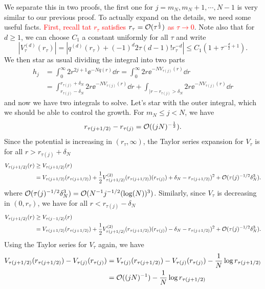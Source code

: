 We separate this in two proofs, the first one for $j = m_N, m_N + 1, \cdots, N-1$  is very similar to our previous proof. To actually expand on the details, we need some useful facts. \textcolor{red}{First, recall tat $r_{\tau}$ satisfies $r_\tau = \mathcal{O}(\tau^{\frac{1}{2}})$ as $\tau \rightarrow 0$}. Note also that for $d \geq 1$, we can choose $C_1$ a constant uniformly for all $\tau$ and write
\begin{equation}
	|V^{(d)}_\tau(r_\tau)| = |q^{(d)}(r_\tau) + (-1)^{d} 2 \tau (d-1)! r_\tau^{-d} | \leq C_1 (1 + \tau^{-\frac{d}{2} + 1}).
\end{equation} 
We then star as usual dividing the integral into two parts
\begin{align}
	h_j & = \int_{0}^{\infty} 2 r^{2j + 1} \ee^{-N q(r)} \dd r = \int_{0}^{\infty} 2 r \ee^{-N V_{\tau(j)} (r)} \dd r \\
	&= \int_{r_{\tau(j)} - \delta_N}^{r_{\tau(j)} + \delta_N} 2 r \ee^{-N V_{\tau(j)}(r)} \dd r+ \int_{|r - r_{\tau(j)} > \delta_N} 2 r \ee^{-NV_{\tau(j)}(r)} \dd r
\end{align}
and now we have two integrals to solve. Let's star with the outer integral, which we should be able to control the growth. For $m_N \leq j < N$, we have
\begin{equation}
	r_{\tau(j + 1/2)} - r_{\tau(j)} = \mathcal{O}((jN)^{-\frac{1}{2}}).
\end{equation}
Since the potential is increasing in $(r_\tau, \infty)$, the Taylor series expansion for $V_\tau$ is for all $r > r_{\tau(j)} + \delta_N$
\begin{align}
	V_{\tau(j + 1/2)}(r) & \geq V_{\tau(j + 1/2)}(r) \\
	& = V_{\tau(j + 1/2)}(r_{\tau(j + 1/2)}) + \frac{1}{2} V^{(2)}_{\tau(j + 1/2)}(r_{\tau(j + 1/2)}) (r_{\tau(j)}) + \delta_N - r_{\tau(j + 1/2)})^2 + \mathcal{O}(\tau(j)^{-1/2} \delta^3_N).
\end{align}
where $\mathcal{O}(\tau(j)^{-1/2} \delta^3_N) = \mathcal{O}(N^{-1} j^{-1/2}(\log(N))^3)$. Similarly, since $V_{\tau}$ is decreasing in $(0, r_\tau)$, we have for all $r < r_{\tau(j)} - \delta_N$
\begin{align}
	V_{\tau(j + 1/2)}(r) & \geq V_{\tau(j - 1/2)}(r) \\
	& = V_{\tau(j + 1/2)}(r_{\tau(j + 1/2)}) + \frac{1}{2} V^{(2)}_{\tau(j + 1/2)}(r_{\tau(j + 1/2)}) (r_{\tau(j)}) - \delta_N - r_{\tau(j + 1/2)})^2 + \mathcal{O}(\tau(j)^{-1/2} \delta^3_N).
\end{align}
Using the Taylor series for $V_\tau$ again, we have
\begin{align}
	V_{\tau(j+1/2)}(r_{\tau(j+1/2)}) - V_{\tau(j)}(r_{\tau(j)}) & = V_{\tau(j)}(r_{\tau(j+1/2)}) - V_{\tau(j)}(r_{\tau(j)}) - \frac{1}{N} \log r_{\tau(j+1/2)} \\
	& = \mathcal{O}((jN)^{-1})  - \frac{1}{N} \log r_{\tau(j+1/2)}
\end{align}
